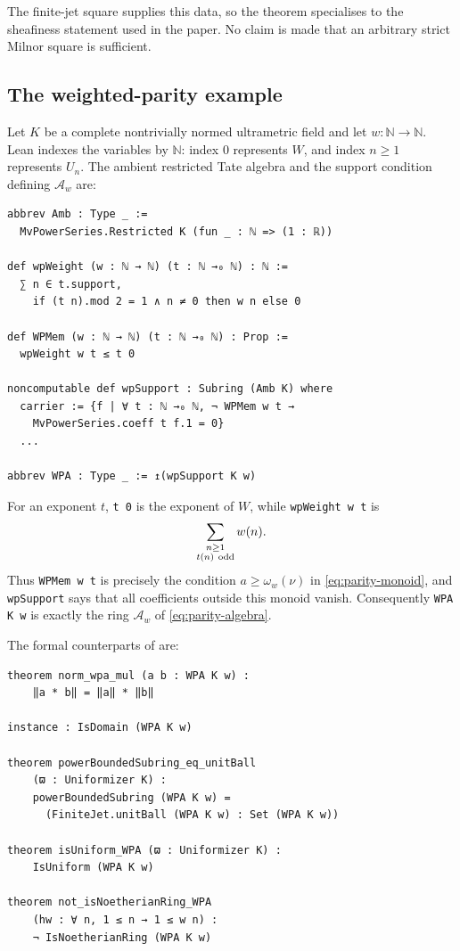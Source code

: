 \documentclass[11pt,reqno]{amsart}
\theoremstyle{definition}
\begin{document}
The finite-jet square supplies this data, so the theorem specialises to the
sheafiness statement used in the paper.  No claim is made that an arbitrary
strict Milnor square is sufficient.

\subsection{The weighted-parity example}

Let \(K\) be a complete nontrivially normed ultrametric field and let
\(w:\mathbb N\to\mathbb N\).  Lean indexes the variables by \(\mathbb N\):
index \(0\) represents \(W\), and index \(n\geq1\) represents \(U_n\).  The
ambient restricted Tate algebra and the support condition defining
\(\mathcal A_w\) are:

\begin{lstlisting}
abbrev Amb : Type _ :=
  MvPowerSeries.Restricted K (fun _ : ℕ => (1 : ℝ))

def wpWeight (w : ℕ → ℕ) (t : ℕ →₀ ℕ) : ℕ :=
  ∑ n ∈ t.support,
    if (t n).mod 2 = 1 ∧ n ≠ 0 then w n else 0

def WPMem (w : ℕ → ℕ) (t : ℕ →₀ ℕ) : Prop :=
  wpWeight w t ≤ t 0

noncomputable def wpSupport : Subring (Amb K) where
  carrier := {f | ∀ t : ℕ →₀ ℕ, ¬ WPMem w t →
    MvPowerSeries.coeff t f.1 = 0}
  ...

abbrev WPA : Type _ := ↥(wpSupport K w)
\end{lstlisting}

For an exponent \(t\), \texttt{t 0} is the exponent of \(W\), while
\texttt{wpWeight w t} is
\[
  \sum_{\substack{n\geq1\\t(n)\ {\rm odd}}}w(n).
\]
Thus \texttt{WPMem w t} is precisely the condition
\(a\geq\omega_w(\nu)\) in \eqref{eq:parity-monoid}, and
\texttt{wpSupport} says that all coefficients outside this monoid vanish.
Consequently \texttt{WPA K w} is exactly the ring \(\mathcal A_w\) of
\eqref{eq:parity-algebra}.

The formal counterparts of
 are:

\begin{lstlisting}
theorem norm_wpa_mul (a b : WPA K w) :
    ‖a * b‖ = ‖a‖ * ‖b‖

instance : IsDomain (WPA K w)

theorem powerBoundedSubring_eq_unitBall
    (ϖ : Uniformizer K) :
    powerBoundedSubring (WPA K w) =
      (FiniteJet.unitBall (WPA K w) : Set (WPA K w))

theorem isUniform_WPA (ϖ : Uniformizer K) :
    IsUniform (WPA K w)

theorem not_isNoetherianRing_WPA
    (hw : ∀ n, 1 ≤ n → 1 ≤ w n) :
    ¬ IsNoetherianRing (WPA K w)
\end{lstlisting}
\end{document}
